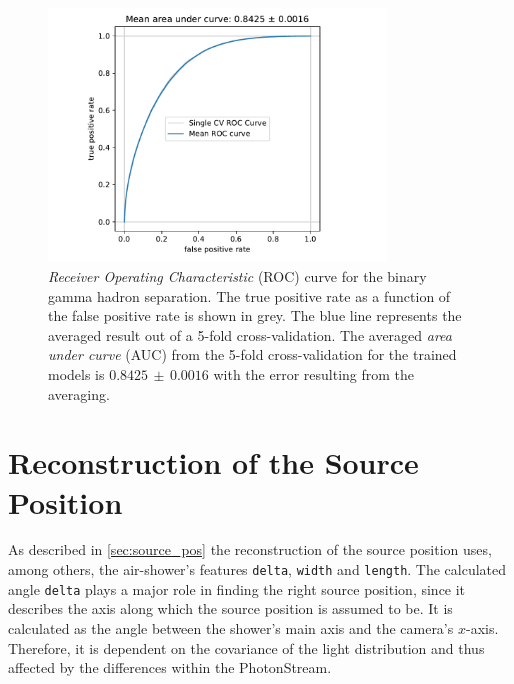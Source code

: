\begin{figure}
  \centering
  \includegraphics[width=0.8\textwidth, page=1]{Plots/results/DBSCAN/separation_performance.pdf}
  \caption{\textit{Receiver Operating Characteristic} (ROC) curve for the binary gamma hadron separation. The true positive rate as a function of the false positive rate is shown in grey. The blue line represents the averaged result out of a 5-fold cross-validation. The averaged \textit{area under curve} (AUC) from the 5-fold cross-validation for the trained models is $0.8425\,\pm\,0.0016$ with the error resulting from the averaging.}
  \label{fig:sep_auc}
\end{figure}
%
%
%

\section{Reconstruction of the Source Position}
%
As described in \autoref{sec:source_pos} the reconstruction of the source
position uses, among others, the air-shower's features \texttt{delta}, \texttt{width} and
\texttt{length}. The calculated angle \texttt{delta} plays a major role in
finding the right source position, since it describes the axis along which
the source position is assumed to be. It is calculated as the angle between
the shower's main axis and the camera's $x$-axis. Therefore, it is dependent
on the covariance of the light distribution and thus affected by the
differences within the PhotonStream.

